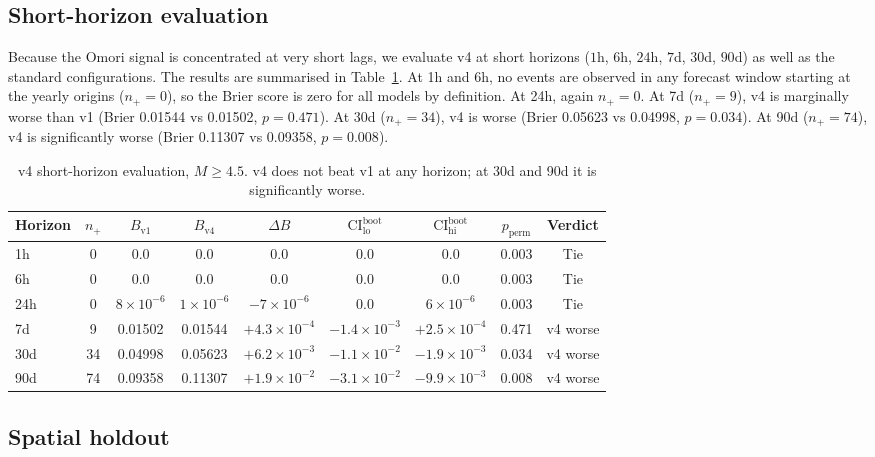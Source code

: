 \documentclass[10pt,a4paper,twocolumn]{article}
\begin{document}
\subsection{Short-horizon evaluation}

Because the Omori signal is concentrated at very short lags, we evaluate v4 at short horizons ($1$h, $6$h, $24$h, $7$d, $30$d, $90$d) as well as the standard configurations. The results are summarised in Table~\ref{tab:v4-short-horizon}. At 1h and 6h, no events are observed in any forecast window starting at the yearly origins ($n_+=0$), so the Brier score is zero for all models by definition. At 24h, again $n_+=0$. At 7d ($n_+=9$), v4 is marginally worse than v1 (Brier 0.01544 vs 0.01502, $p=0.471$). At 30d ($n_+=34$), v4 is worse (Brier 0.05623 vs 0.04998, $p=0.034$). At 90d ($n_+=74$), v4 is significantly worse (Brier 0.11307 vs 0.09358, $p=0.008$).

\begin{table}[t]
\centering
\caption{v4 short-horizon evaluation, $M\geq4.5$. v4 does not beat v1 at any horizon; at 30d and 90d it is significantly worse.}\label{tab:v4-short-horizon}
\small
\begin{tabular*}{\textwidth}{@{\extracolsep{\fill}}lcccccccc}
\toprule
Horizon & $n_+$ & $B_{\text{v1}}$ & $B_{\text{v4}}$ & $\Delta B$ & $\text{CI}^{\text{boot}}_{\text{lo}}$ & $\text{CI}^{\text{boot}}_{\text{hi}}$ & $p_{\text{perm}}$ & Verdict \\
\midrule
1h  & 0 & 0.0       & 0.0       & 0.0       & 0.0       & 0.0       & 0.003 & Tie \\
6h  & 0 & 0.0       & 0.0       & 0.0       & 0.0       & 0.0       & 0.003 & Tie \\
24h & 0 & $8\times10^{-6}$ & $1\times10^{-6}$ & $-7\times10^{-6}$ & 0.0 & $6\times10^{-6}$ & 0.003 & Tie \\
7d  & 9 & 0.01502 & 0.01544 & $+4.3\times10^{-4}$ & $-1.4\times10^{-3}$ & $+2.5\times10^{-4}$ & 0.471 & v4 worse \\
30d & 34 & 0.04998 & 0.05623 & $+6.2\times10^{-3}$ & $-1.1\times10^{-2}$ & $-1.9\times10^{-3}$ & 0.034 & v4 worse \\
90d & 74 & 0.09358 & 0.11307 & $+1.9\times10^{-2}$ & $-3.1\times10^{-2}$ & $-9.9\times10^{-3}$ & 0.008 & v4 worse \\
\bottomrule
\end{tabular*}
\end{table}

\subsection{Spatial holdout}
\end{document}
